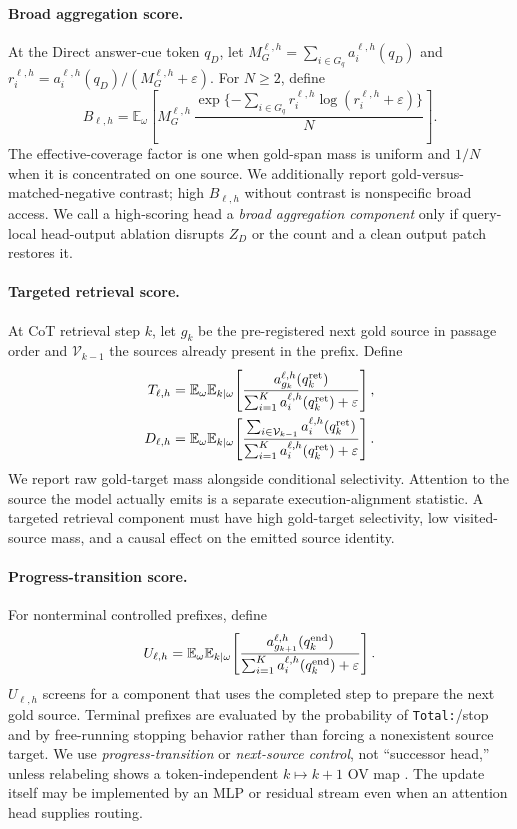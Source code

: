\documentclass[10pt,twocolumn]{article}
\newcommand{\E}{\mathbb{E}}
\newcommand{\eps}{\varepsilon}
\begin{document}
\paragraph{Broad aggregation score.}
At the Direct answer-cue token $q_D$, let
$M_G^{\ell,h}=\sum_{i\in G_q}a_i^{\ell,h}(q_D)$ and
$r_i^{\ell,h}=a_i^{\ell,h}(q_D)/(M_G^{\ell,h}+\eps)$. For $N\geq2$, define
\[
 B_{\ell,h}=\E_\omega\!\left[
 M_G^{\ell,h}\,
 \frac{\exp\{-\sum_{i\in G_q}r_i^{\ell,h}\log(r_i^{\ell,h}+\eps)\}}{N}
 \right].
\]
The effective-coverage factor is one when gold-span mass is uniform and $1/N$ when it is
concentrated on one source. We additionally report gold-versus-matched-negative contrast; high
$B_{\ell,h}$ without contrast is nonspecific broad access. We call a high-scoring head a
\emph{broad aggregation component} only if query-local head-output ablation disrupts $Z_D$ or
the count and a clean output patch restores it.

\paragraph{Targeted retrieval score.}
At CoT retrieval step $k$, let $g_k$ be the pre-registered next gold source in passage order and
$\mathcal V_{k-1}$ the sources already present in the prefix. Define
\[
\begin{aligned}
 T_{\ell,h}&=\E_\omega\E_{k\mid\omega}\!\left[
 \frac{a_{g_k}^{\ell,h}(q_k^{\rm ret})}
      {\sum_{i=1}^K a_i^{\ell,h}(q_k^{\rm ret})+\eps}
 \right],\\
 D_{\ell,h}&=\E_\omega\E_{k\mid\omega}\!\left[
 \frac{\sum_{i\in\mathcal V_{k-1}}a_i^{\ell,h}(q_k^{\rm ret})}
      {\sum_{i=1}^K a_i^{\ell,h}(q_k^{\rm ret})+\eps}
 \right].
\end{aligned}
\]
We report raw gold-target mass alongside conditional selectivity. Attention to the source the
model actually emits is a separate execution-alignment statistic. A targeted retrieval
component must have high gold-target selectivity, low visited-source mass, and a causal effect
on the emitted source identity.

\paragraph{Progress-transition score.}
For nonterminal controlled prefixes, define
\[
 U_{\ell,h}=\E_\omega\E_{k\mid\omega}\!\left[
 \frac{a_{g_{k+1}}^{\ell,h}(q_k^{\rm end})}
      {\sum_{i=1}^K a_i^{\ell,h}(q_k^{\rm end})+\eps}
 \right].
\]
$U_{\ell,h}$ screens for a component that uses the completed step to prepare the next gold
source. Terminal prefixes are evaluated by the probability of \texttt{Total:}/stop and by
free-running stopping behavior rather than forcing a nonexistent source target. We use
\emph{progress-transition} or \emph{next-source control}, not ``successor head,'' unless
relabeling shows a token-independent $k\mapsto k+1$ OV map
\citep{gould2023successor}. The update itself may be implemented by an MLP or residual stream
even when an attention head supplies routing.
\end{document}
